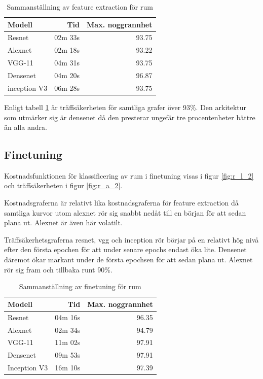 \documentclass[]{kththesis}
\begin{document}
\begin{table}[!htbp]
  \centering
  \begin{tabular}{|l|r|r|}
    Modell & Tid & Max. noggrannhet \\ 
    \hline
    Resnet       & 02m 33s & 93.75 \\
    Alexnet      & 02m 18s & 93.22 \\
    VGG-11       & 04m 31s & 93.75 \\
    Densenet     & 04m 20s & 96.87 \\
    inception V3 & 06m 28s & 93.75 \\
  \end{tabular}
  \caption{Sammanställning av feature extraction för rum}
  \label{fig:sam_5}
\end{table}

Enligt tabell \ref{fig:sam_5} är träffsäkerheten för samtliga grafer över 93\%.
Den arkitektur som utmärker sig är densenet då den presterar ungefär tre procentenheter bättre än alla andra.

\subsection{Finetuning}
Kostnadsfunktionen för klassificering av rum i finetuning visas i figur \ref{fig:r_l_2} och träffsäkerheten i figur \ref{fig:r_a_2}.

Kostnadsgraferna är relativt lika kostnadsgraferna för feature extraction då samtliga kurvor utom alexnet rör sig snabbt nedåt till en början för att sedan plana ut.
Alexnet är även här volatilt.

Träffsäkerhetsgraferna resnet, vgg och inception rör börjar på en relativt hög nivå efter den första epochen för att under senare epochs endast öka lite.
Densenet däremot ökar markant under de första epochsen för att sedan plana ut. 
Alexnet rör sig fram och tillbaka runt 90\%. 

\begin{table}[!htbp]
  \centering
  \begin{tabular}{|l|r|r|}
    Modell & Tid & Max. noggrannhet \\ 
    \hline
    Resnet       & 04m 16s & 96.35 \\
    Alexnet      & 02m 34s & 94.79 \\
    VGG-11       & 11m 02s & 97.91 \\
    Densenet     & 09m 53s & 97.91 \\
    Inception V3 & 16m 10s & 97.39 \\
  \end{tabular}
  \caption{Sammanställning av finetuning för rum}
  \label{fig:sam_6}    
\end{table}
\end{document}

